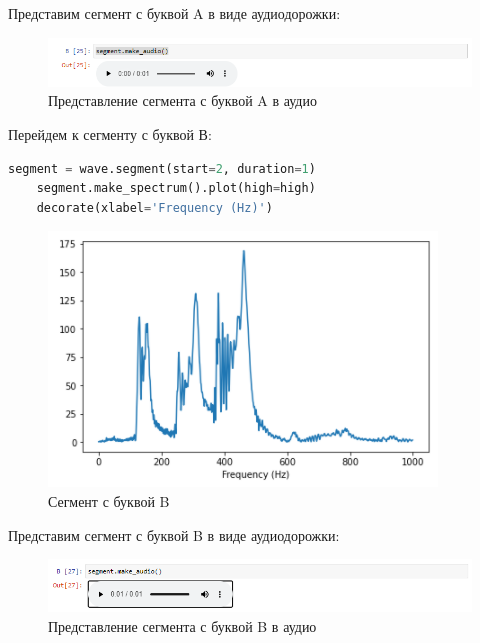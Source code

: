 \documentclass[a4paper]{article}
\begin{document}
            Представим сегмент с буквой A в виде аудиодорожки:
            
            \begin{figure}[H]
                \centering
                \includegraphics[width=\textwidth]{ex_6_letter_a_audio.png}
                \caption{Представление сегмента с буквой A в аудио}
                \label{fig:ex_6_letter_a_audio}
            \end{figure}
            
            Перейдем к сегменту с буквой В:
            
\begin{lstlisting}[language=Python, caption= Сегмент с буквой B]
    segment = wave.segment(start=2, duration=1)
    segment.make_spectrum().plot(high=high)
    decorate(xlabel='Frequency (Hz)')
\end{lstlisting}   
            
             \begin{figure}[H]
                \centering
                \includegraphics{ex_6_letter_b_segment.png}
                \caption{Сегмент с буквой B}
                \label{fig:ex_6_letter_b_segment}
            \end{figure}
            
            Представим сегмент с буквой B в виде аудиодорожки:
            
            \begin{figure}[H]
                \centering
                \includegraphics[width=\textwidth]{ex_6_letter_b_audio.png}
                \caption{Представление сегмента с буквой B в аудио}
                \label{fig:ex_6_letter_b_audio}
            \end{figure}
            
\end{document}
